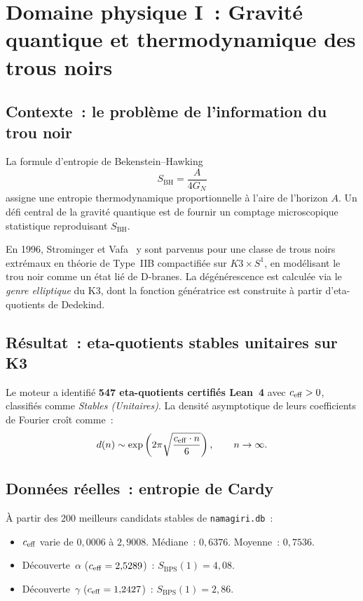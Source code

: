 \section{Domaine physique I~: Gravité quantique et thermodynamique des trous noirs}
\label{sec:qg}

\subsection{Contexte~: le problème de l'information du trou noir}
La formule d'entropie de Bekenstein--Hawking~\cite{bekenstein_1973,hawking_1975}
\begin{equation}
  S_{\mathrm{BH}} = \frac{A}{4G_N}
\end{equation}
assigne une entropie thermodynamique proportionnelle à l'aire de l'horizon $A$. Un défi central de la gravité quantique est de fournir un comptage microscopique statistique reproduisant $S_{\mathrm{BH}}$.

En 1996, Strominger et Vafa~\cite{strominger_vafa_1996} y sont parvenus pour une classe de trous noirs extrémaux en théorie de Type~IIB compactifiée sur $K3 \times S^1$, en modélisant le trou noir comme un état lié de D-branes. La dégénérescence est calculée via le \emph{genre elliptique} du K3, dont la fonction génératrice est construite à partir d'eta-quotients de Dedekind.

\subsection{Résultat~: eta-quotients stables unitaires sur K3}
Le moteur \RAMA{} a identifié \textbf{547 eta-quotients certifiés Lean~4} avec $c_{\mathrm{eff}} > 0$, classifiés comme \emph{Stables (Unitaires)}. La densité asymptotique de leurs coefficients de Fourier croît comme~:
\begin{equation}
  d(n) \sim \exp\left(2\pi\sqrt{\frac{c_{\mathrm{eff}} \cdot n}{6}}\right), \qquad n \to \infty.
\end{equation}

\subsection{Données réelles~: entropie de Cardy}
À partir des 200 meilleurs candidats stables de \texttt{namagiri.db}~:
\begin{itemize}
  \item $c_{\mathrm{eff}}$ varie de $0{,}0006$ à $2{,}9008$. Médiane~: $0{,}6376$. Moyenne~: $0{,}7536$.
  \item Découverte~$\alpha$ ($c_{\mathrm{eff}} = 2{,}5289$)~: $S_{\mathrm{BPS}}(1) = 4{,}08$.
  \item Découverte~$\gamma$ ($c_{\mathrm{eff}} = 1{,}2427$)~: $S_{\mathrm{BPS}}(1) = 2{,}86$.
\end{itemize}

